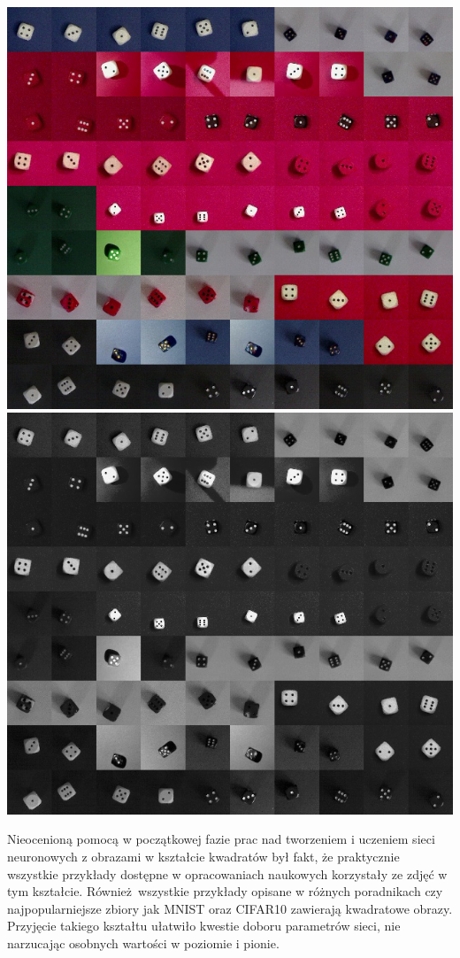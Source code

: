 \includegraphics[scale=0.35]{images/kolaz}
\includegraphics[scale=0.35]{images/kolaz_grayscale}

Nieocenioną pomocą w początkowej fazie prac nad tworzeniem i uczeniem sieci neuronowych
z obrazami w kształcie kwadratów był fakt, że praktycznie wszystkie przykłady dostępne
w opracowaniach naukowych korzystały ze zdjęć w tym kształcie. Również wszystkie
przykłady opisane w różnych poradnikach czy najpopularniejsze zbiory jak MNIST oraz
CIFAR10 zawierają kwadratowe obrazy. Przyjęcie takiego kształtu ułatwiło kwestie
doboru parametrów sieci, nie narzucając osobnych wartości w poziomie i pionie.

